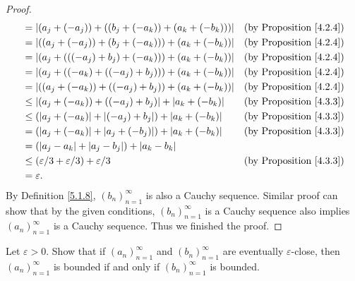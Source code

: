 \begin{proof}
\begin{align*}
&= |(a_j + (-a_j)) + ((b_j + (-a_k)) + (a_k + (-b_k)))| & \text{(by Proposition \ref{4.2.4})} \\
&= |((a_j + (-a_j)) + (b_j + (-a_k))) + (a_k + (-b_k))| & \text{(by Proposition \ref{4.2.4})} \\
&= |(a_j + (((-a_j) + b_j) + (-a_k))) + (a_k + (-b_k))| & \text{(by Proposition \ref{4.2.4})} \\
&= |(a_j + ((-a_k) + ((-a_j) + b_j))) + (a_k + (-b_k))| & \text{(by Proposition \ref{4.2.4})} \\
&= |((a_j + (-a_k)) + ((-a_j) + b_j)) + (a_k + (-b_k))| & \text{(by Proposition \ref{4.2.4})} \\
&\leq |(a_j + (-a_k)) + ((-a_j) + b_j)| + |a_k + (-b_k)| & \text{(by Proposition \ref{4.3.3})} \\
&\leq (|a_j + (-a_k)| + |(-a_j) + b_j|) + |a_k + (-b_k)| & \text{(by Proposition \ref{4.3.3})} \\
&= (|a_j + (-a_k)| + |a_j + (-b_j)|) + |a_k + (-b_k)| & \text{(by Proposition \ref{4.3.3})} \\
&= (|a_j - a_k| + |a_j - b_j|) + |a_k - b_k| \\
&\leq (\varepsilon / 3 + \varepsilon / 3) + \varepsilon / 3 & \text{(by Proposition \ref{4.3.3})} \\
&= \varepsilon.
\end{align*}
By Definition \ref{5.1.8}, \((b_n)_{n = 1}^{\infty}\) is also a Cauchy sequence.
Similar proof can show that by the given conditions, \((b_n)_{n = 1}^{\infty}\) is a Cauchy sequence also implies \((a_n)_{n = 1}^{\infty}\) is a Cauchy sequence.
Thus we finished the proof.
\end{proof}

\begin{exercise}\label{ex 5.2.2}
Let \(\varepsilon > 0\).
Show that if \((a_n)_{n = 1}^{\infty}\) and \((b_n)_{n = 1}^{\infty}\) are eventually \(\varepsilon\)-close, then \((a_n)_{n = 1}^{\infty}\) is bounded if and only if \((b_n)_{n = 1}^{\infty}\) is bounded.
\end{exercise}

